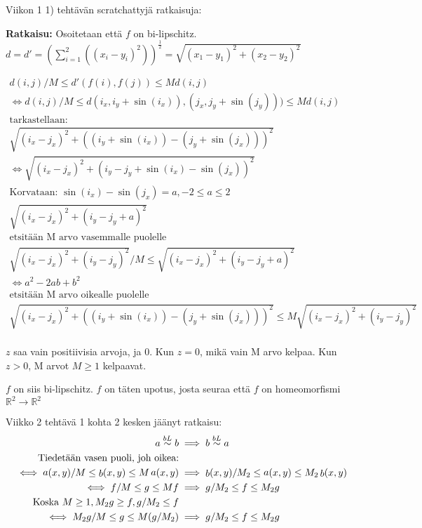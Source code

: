 Viikon 1 1) tehtävän scratchattyjä ratkaisuja:

\textbf{Ratkaisu: } 
Osoitetaan että $f$ on bi-lipschitz. 
\\
$d = d' = (\sum^2_{i=1}((x_i - y_i)^2))^{\frac{1}{2}} = \sqrt{(x_1 - y_1)^2 + (x_2 - y_2)^2}$  

\begin{align*}
    d(i, j) / M \leq d'(f(i), f(j)) \leq M d(i, j) \\
    \iff d(i, j) / M \leq d(i_x,i_y+\sin(i_x)), (j_x,j_y+\sin(j_y))) \leq M d(i, j) \\ 
    \text{tarkastellaan: } \\
    \sqrt{(i_x - j_x)^2 + ((i_y+\sin(i_x)) - (j_y+\sin(j_x)))^2} \\
    \iff \sqrt{(i_x - j_x)^2 + (i_y - j_y + \sin(i_x) - \sin(j_x))^2}\\
    \text{Korvataan: } \sin(i_x) - \sin(j_x)=a, -2 \leq a \leq 2 \\
    \sqrt{(i_x - j_x)^2 + (i_y - j_y + a)^2} \\
    \text{etsitään M arvo vasemmalle puolelle} \\
    \sqrt{(i_x - j_x)^2 + (i_y - j_y)^2} / M \leq \sqrt{(i_x - j_x)^2 + (i_y - j_y + a)^2} \\
    \iff a^2 - 2 a b + b^2 \\
    \text{etsitään M arvo oikealle puolelle} \\
    \sqrt{(i_x - j_x)^2 + ((i_y+\sin(i_x)) - (j_y+\sin(j_x)))^2} \leq M \sqrt{(i_x - j_x)^2 + (i_y - j_y)^2} \\
\end{align*}


$z$ saa vain positiivisia arvoja, ja 0. Kun $z=0$, mikä vain M arvo kelpaa. Kun $z > 0$, M arvot $M \geq 1$ kelpaavat.

$f$ on siis bi-lipschitz. $f$ on täten upotus, josta seuraa että $f$ on homeomorfismi $\mathbb R^2 \to \mathbb R^2$


Viikko 2 tehtävä 1 kohta 2 kesken jäänyt ratkaisu:
\begin{align*}a \buildrel{bL}\over\sim b &\implies b \buildrel{bL}\over\sim a \\
    \text{Tiedetään vasen puoli, joh oikea:} \\
    \iff \mathop{a}(x, y)/M \leq \mathop{b}(x, y) \leq M \mathop{a}(x, y) &\implies \mathop{b}(x, y)/M_2 \leq \mathop{a}(x, y) \leq M_2 \mathop{b}(x, y) \\
    \iff f /M \leq g \leq M f &\implies g/M_2 \leq f \leq M_2 g \\
    \text{Koska }M \geq 1, M_2g \geq f, g/M_2 \leq f  \\
    \iff M_2 g /M \leq g \leq M (g/M_2) &\implies g/M_2 \leq f \leq M_2 g
        \end{align*}

